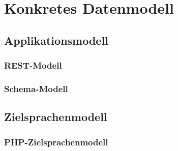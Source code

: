 \section{Konkretes Datenmodell}
\label{sec:concrete_model}

\subsection{Applikationsmodell}
\label{sec:application_model}

\subsubsection{REST-Modell}
\label{sec:rest_model}

\subsubsection{Schema-Modell}
\label{sec:schema_model}

\subsection{Zielsprachenmodell}
\label{sec:abstract_target_language_model}

\subsubsection{PHP-Zielsprachenmodell}
\label{sec:php_target_language_model}

